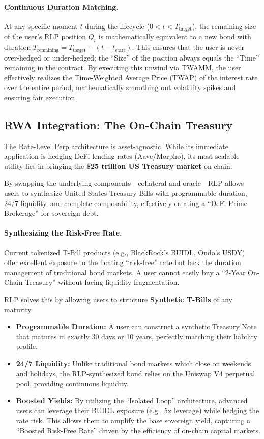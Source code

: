 \documentclass[12pt]{article}
\begin{document}
\paragraph{Continuous Duration Matching.}
At any specific moment $t$ during the lifecycle ($0 < t < T_{\text{target}}$), the remaining size of the user's RLP position $Q_t$ is mathematically equivalent to a new bond with duration $T_{\text{remaining}} = T_{\text{target}} - (t - t_{\text{start}})$. This ensures that the user is never over-hedged or under-hedged; the ``Size'' of the position always equals the ``Time'' remaining in the contract. By executing this unwind via TWAMM, the user effectively realizes the Time-Weighted Average Price (TWAP) of the interest rate over the entire period, mathematically smoothing out volatility spikes and ensuring fair execution.

\subsection{RWA Integration: The On-Chain Treasury}

The Rate-Level Perp architecture is asset-agnostic. While its immediate application is hedging DeFi lending rates (Aave/Morpho), its most scalable utility lies in bringing the \textbf{\$25 trillion US Treasury market} on-chain.

By swapping the underlying components---collateral and oracle---RLP allows users to synthesize United States Treasury Bills with programmable duration, 24/7 liquidity, and complete composability, effectively creating a ``DeFi Prime Brokerage'' for sovereign debt.

\paragraph{Synthesizing the Risk-Free Rate.}
Current tokenized T-Bill products (e.g., BlackRock's BUIDL, Ondo's USDY) offer excellent exposure to the floating ``risk-free'' rate but lack the duration management of traditional bond markets. A user cannot easily buy a ``2-Year On-Chain Treasury'' without facing liquidity fragmentation.

RLP solves this by allowing users to structure \textbf{Synthetic T-Bills} of any maturity.

\begin{itemize}
    \item \textbf{Programmable Duration:} A user can construct a synthetic Treasury Note that matures in exactly 30 days or 10 years, perfectly matching their liability profile.
    \item \textbf{24/7 Liquidity:} Unlike traditional bond markets which close on weekends and holidays, the RLP-synthesized bond relies on the Uniswap V4 perpetual pool, providing continuous liquidity.
    \item \textbf{Boosted Yields:} By utilizing the ``Isolated Loop'' architecture, advanced users can leverage their BUIDL exposure (e.g., 5x leverage) while hedging the rate risk. This allows them to amplify the base sovereign yield, capturing a ``Boosted Risk-Free Rate'' driven by the efficiency of on-chain capital markets.
\end{itemize}
\end{document}
